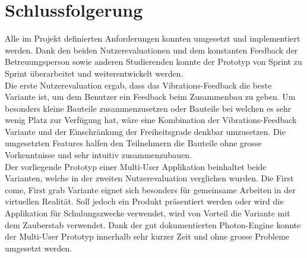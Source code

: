 \chapter{Schlussfolgerung}
\label{ch:Schlussfolgerung}

Alle im Projekt definierten Anforderungen konnten umgesetzt und implementiert werden. Dank den beiden Nutzerevaluationen und dem konstanten Feedback der Betreuungsperson sowie anderen Studierenden konnte der Prototyp von Sprint zu Sprint überarbeitet und weiterentwickelt werden. \\

\noindent Die erste Nutzerevaluation ergab, dass das Vibrations-Feedback die beste Variante ist, um dem Benutzer ein Feedback beim Zusammenbau zu geben. Um besonders kleine Bauteile zusammenzusetzen oder Bauteile bei welchen es sehr wenig Platz zur Verfügung hat, wäre eine Kombination der Vibrations-Feedback Variante und der Einschränkung der Freiheitsgrade denkbar umzusetzen. Die umgesetzten Features halfen den Teilnehmern die Bauteile ohne grosse Vorkenntnisse und sehr intuitiv zusammenzubauen. \\

\noindent Der vorliegende Prototyp einer Multi-User Applikation beinhaltet beide Varianten, welche in der zweiten Nutzerevaluation verglichen wurden. Die \grqq First come, First grab\grqq{} Variante eignet sich besonders für gemeinsame Arbeiten in der virtuellen Realität. Soll jedoch ein Produkt präsentiert werden oder wird die Applikation für Schulungszwecke verwendet, wird von Vorteil die Variante mit dem Zauberstab verwendet. Dank der gut dokumentierten Photon-Engine konnte der Multi-User Prototyp innerhalb sehr kurzer Zeit und ohne grosse Probleme umgesetzt werden. 